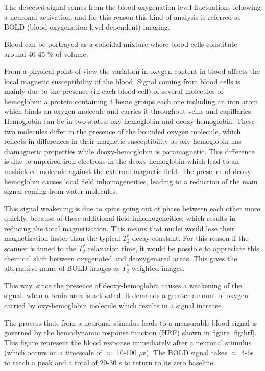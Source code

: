 \documentclass[11pt]{report}
\begin{document}
The detected signal comes from the blood oxygenation level fluctuations following a neuronal activation, and for this reason this kind of analysis is referred as BOLD (blood oxygenation level-dependent) imaging.

Blood can be portrayed as a colloidal mixture where blood cells constitute around 40-45 \% of volume. \cite{brown-2014}

From a physical point of view the variation in oxygen content in blood affects the local magnetic susceptibility of the blood.
Signal coming from blood cells is mainly due to the presence (in each blood cell) of several molecules of hemoglobin: a protein containing 4 heme groups each one including an iron atom which binds an oxygen molecule and carries it throughout veins and capillaries.
Hemoglobin can be in two states: oxy-hemoglobin and deoxy-hemoglobin.
These two molecules differ in the presence of the bounded oxygen molecule, which reflects in differences in their magnetic susceptibility as oxy-hemoglobin has diamagnetic properties while deoxy-hemoglobin is paramagnetic.
This difference is due to unpaired iron electrons in the deoxy-hemoglobin which lead to an unshielded molecule against the external magnetic field.
The presence of deoxy-hemoglobin causes local field inhomogeneities, leading to a reduction of the main signal coming from water molecules.

This signal weakening is due to spins going out of phase between each other more quickly, because of these additional field inhomogeneities, which results in reducing the total magnetization.
This means that nuclei would lose their magnetization faster than the typical $T_2^*$ decay constant.
For this reason if the scanner is tuned to the $T_2^*$ relaxation time, it would be possible to appreciate this chemical shift between oxygenated and deoxygenated areas. This gives the alternative name of BOLD-images as $T_2^{\ast}$-weighted images. \cite{huettel-2009}

This way, since the presence of deoxy-hemoglobin causes a weakening of the signal, when a brain area is activated, it demands a greater amount of oxygen carried by oxy-hemoglobin molecule which results in a signal increase.

The process that, from a neuronal stimulus leads to a measurable blood signal is governed by the hemodynamic response function (HRF) shown in figure \ref{fig:hrf}. This figure represent the blood response immediately after a neuronal stimulus (which occurs on a timescale of $\approx$ 10-100 $\mu$s). The BOLD signal takes $\approx$ 4-6s to reach a peak and a total of 20-30 s to return to its zero baseline.
\end{document}
